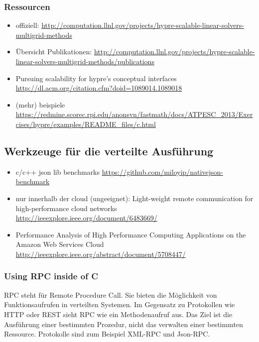 \documentclass[a4paper,10pt]{article}
\begin{document}
\subsubsection{Ressourcen}

\begin{itemize}
 \item offiziell: \url{http://computation.llnl.gov/projects/hypre-scalable-linear-solvers-multigrid-methods}
 \item Übersicht Publikationen: \url{http://computation.llnl.gov/projects/hypre-scalable-linear-solvers-multigrid-methods/publications}
 \item Pursuing scalability for hypre's conceptual interfaces \url{http://dl.acm.org/citation.cfm?doid=1089014.1089018}
 \item (mehr) beispiele \url{https://redmine.scorec.rpi.edu/anonsvn/fastmath/docs/ATPESC_2013/Exercises/hypre/examples/README_files/c.html}
\end{itemize}

\subsection{Werkzeuge für die verteilte Ausführung}

\begin{itemize}
 \item c/c++ json lib benchmarks \url{https://github.com/miloyip/nativejson-benchmark}
 \item nur innerhalb der cloud (ungeeignet): Light-weight remote communication for high-performance cloud networks \url{http://ieeexplore.ieee.org/document/6483669/}
 \item Performance Analysis of High Performance Computing Applications on the Amazon Web Services Cloud \url{http://ieeexplore.ieee.org/abstract/document/5708447/}
\end{itemize}

\subsubsection{Using RPC inside of C}

RPC steht für Remote Procedure Call.
Sie bieten die Möglichkeit von Funktionsaufrufen in verteilten Systemen.
Im Gegensatz zu Protokollen wie HTTP oder REST sieht RPC wie ein Methodenaufruf aus.
Das Ziel ist die Ausführung einer bestimmten Prozedur, nicht das verwalten einer bestimmten Ressource.
Protokolle sind zum Beispiel XML-RPC und Json-RPC.
\end{document}
